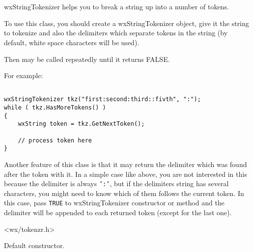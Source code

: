 \section{}\label{wxstringtokenizer}

wxStringTokenizer helps you to break a string up into a number of tokens.

To use this class, you should create a wxStringTokenizer object, give it the
string to tokenize and also the delimiters which separate tokens in the string
(by default, white space characters will be used).

Then  may be called
repeatedly until it  
returns FALSE.

For example:

\begin{verbatim}

wxStringTokenizer tkz("first:second:third::fivth", ":");
while ( tkz.HasMoreTokens() )
{
    wxString token = tkz.GetNextToken();

    // process token here
}
\end{verbatim}

Another feature of this class is that it may return the delimiter which
was found after the token with it. In a simple case like above, you are not
interested in this because the delimiter is always {\tt ':'}, but if the
delimiters string has several characters, you might need to know which of them
follows the current token. In this case, pass {\tt TRUE} to wxStringTokenizer
constructor or  method and
the delimiter will be appended to each returned token (except for the last
one).




<wx/tokenzr.h>


\label{wxstringtokenizerwxstringtokenizer}


Default constructor.


